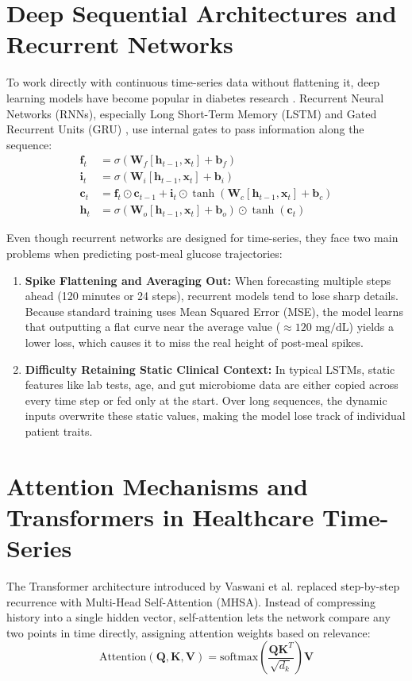 \section{Deep Sequential Architectures and Recurrent Networks}
To work directly with continuous time-series data without flattening it, deep learning models have become popular in diabetes research \cite{zhu2021deep}. Recurrent Neural Networks (RNNs), especially Long Short-Term Memory (LSTM) \cite{mirshekarian2019using} and Gated Recurrent Units (GRU) \cite{martinsson2020blood}, use internal gates to pass information along the sequence:
\begin{align}
    \mathbf{f}_t &= \sigma(\mathbf{W}_f [\mathbf{h}_{t-1}, \mathbf{x}_t] + \mathbf{b}_f) \\
    \mathbf{i}_t &= \sigma(\mathbf{W}_i [\mathbf{h}_{t-1}, \mathbf{x}_t] + \mathbf{b}_i) \\
    \mathbf{c}_t &= \mathbf{f}_t \odot \mathbf{c}_{t-1} + \mathbf{i}_t \odot \tanh(\mathbf{W}_c [\mathbf{h}_{t-1}, \mathbf{x}_t] + \mathbf{b}_c) \\
    \mathbf{h}_t &= \sigma(\mathbf{W}_o [\mathbf{h}_{t-1}, \mathbf{x}_t] + \mathbf{b}_o) \odot \tanh(\mathbf{c}_t)
\end{align}

Even though recurrent networks are designed for time-series, they face two main problems when predicting post-meal glucose trajectories:
\begin{enumerate}
    \item \textbf{Spike Flattening and Averaging Out:} When forecasting multiple steps ahead (120 minutes or 24 steps), recurrent models tend to lose sharp details. Because standard training uses Mean Squared Error (MSE), the model learns that outputting a flat curve near the average value ($\approx 120\text{ mg/dL}$) yields a lower loss, which causes it to miss the real height of post-meal spikes.
    \item \textbf{Difficulty Retaining Static Clinical Context:} In typical LSTMs, static features like lab tests, age, and gut microbiome data are either copied across every time step or fed only at the start. Over long sequences, the dynamic inputs overwrite these static values, making the model lose track of individual patient traits.
\end{enumerate}

\section{Attention Mechanisms and Transformers in Healthcare Time-Series}
The Transformer architecture introduced by Vaswani et al. \cite{vaswani2017attention} replaced step-by-step recurrence with Multi-Head Self-Attention (MHSA). Instead of compressing history into a single hidden vector, self-attention lets the network compare any two points in time directly, assigning attention weights based on relevance:
\begin{equation}
    \text{Attention}(\mathbf{Q}, \mathbf{K}, \mathbf{V}) = \text{softmax}\left(\frac{\mathbf{Q} \mathbf{K}^T}{\sqrt{d_k}}\right) \mathbf{V}
\end{equation}

